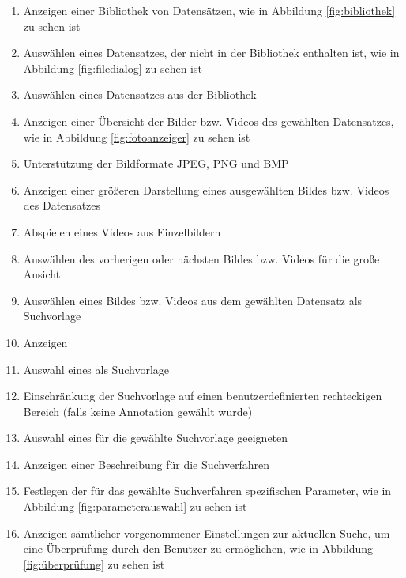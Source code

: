 \begin{enumerate} [label=\bfseries /F \arabic*0/, leftmargin=*]
	\item Anzeigen einer Bibliothek von Datensätzen, wie in Abbildung \ref{fig:bibliothek} zu sehen ist \label{f:bibliothek_anzeigen}
	\item Auswählen eines Datensatzes, der nicht in der Bibliothek enthalten ist, wie in Abbildung \ref{fig:filedialog} zu sehen ist \label{f:datensatz_hinzufuegen}
	\item Ausw\"ahlen eines Datensatzes aus der Bibliothek \label{f:auswahl_eines_datensatzes}
	\item Anzeigen einer Übersicht der Bilder bzw. Videos des gewählten Datensatzes, wie in Abbildung \ref{fig:fotoanzeiger} zu sehen ist \label{f:uebersicht_anzeigen}
	\item Unterstützung der Bildformate JPEG, PNG und BMP \label{f:bildformate}
	\item Anzeigen einer größeren Darstellung eines ausgewählten Bildes bzw. Videos des Datensatzes \label{f:anzeigen_groessere_darstellung}
	\item Abspielen eines Videos aus Einzelbildern \label{f:video_abspielen}
	\item Auswählen des vorherigen oder nächsten Bildes bzw. Videos für die große Ansicht \label{f:vorheriges_naechstes}
	\item Ausw\"ahlen eines Bildes bzw. Videos aus dem gewählten Datensatz als Suchvorlage \label{f:bildauswahl}
	\item Anzeigen  \label{f:annotation_anzeigen}
	\item Auswahl eines  als Suchvorlage \label{f:annotation_auswaehlen}
	\item Einschränkung der Suchvorlage auf einen benutzerdefinierten rechteckigen Bereich (falls keine \gls{Annotation} gewählt wurde) \label{f:bereich_auswaehlen}
	\item Auswahl eines für die gewählte Suchvorlage geeigneten  \label{f:auswahl_suchverfahren}
	\item Anzeigen einer Beschreibung für die \gls{Suchverfahren} \label{f:beschreibung_suchverfahren}
	\item Festlegen der für das gewählte \gls{Suchverfahren} spezifischen Parameter, wie in Abbildung \ref{fig:parameterauswahl} zu sehen ist \label{f:parameterwahl}
	\item Anzeigen sämtlicher vorgenommener Einstellungen zur aktuellen Suche, um eine Überprüfung durch den Benutzer zu ermöglichen, wie in Abbildung \ref{fig:überprüfung} zu sehen ist \label{f:ueberpruefung}

\end{enumerate}
